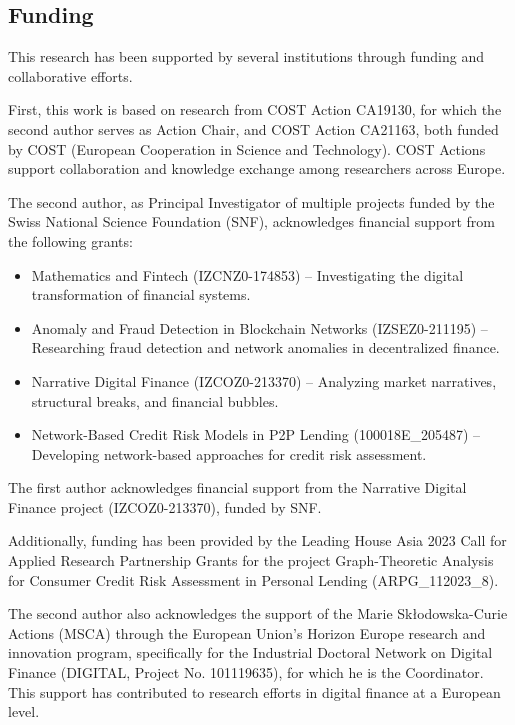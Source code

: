 \documentclass{article}[a4paper]
\begin{document}
\subsection*{Funding}

This research has been supported by several institutions through funding and collaborative efforts.

First, this work is based on research from COST Action CA19130, for which the second author serves as Action Chair, and COST Action CA21163, both funded by COST (European Cooperation in Science and Technology). COST Actions support collaboration and knowledge exchange among researchers across Europe.

The second author, as Principal Investigator of multiple projects funded by the Swiss National Science Foundation (SNF), acknowledges financial support from the following grants:
\begin{itemize}
    \item Mathematics and Fintech (IZCNZ0-174853) – Investigating the digital transformation of financial systems.
    \item Anomaly and Fraud Detection in Blockchain Networks (IZSEZ0-211195) – Researching fraud detection and network anomalies in decentralized finance.
    \item Narrative Digital Finance (IZCOZ0-213370) – Analyzing market narratives, structural breaks, and financial bubbles.
    \item Network-Based Credit Risk Models in P2P Lending (100018E\_205487) – Developing network-based approaches for credit risk assessment.
\end{itemize}

The first author acknowledges financial support from the Narrative Digital Finance project (IZCOZ0-213370), funded by SNF.

Additionally, funding has been provided by the Leading House Asia 2023 Call for Applied Research Partnership Grants for the project Graph-Theoretic Analysis for Consumer Credit Risk Assessment in Personal Lending (ARPG\_112023\_8).

The second author also acknowledges the support of the Marie Skłodowska-Curie Actions (MSCA) through the European Union’s Horizon Europe research and innovation program, specifically for the Industrial Doctoral Network on Digital Finance (DIGITAL, Project No. 101119635), for which he is the Coordinator. This support has contributed to research efforts in digital finance at a European level.
\end{document}
